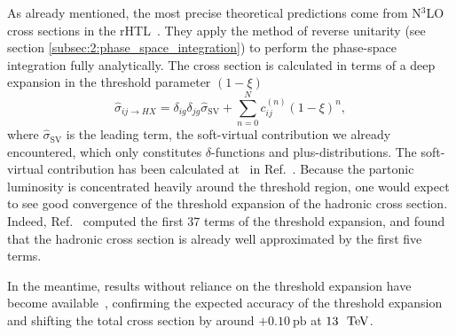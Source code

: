 As already mentioned, the most precise theoretical predictions come from N${}^3$LO cross sections in the \acs{rHTL}~\cite{Anastasiou:2015vya, Anastasiou:2016cez}. They apply the method of reverse unitarity (see section \ref{subsec:2:phase_space_integration}) to perform the phase-space integration fully analytically. The cross section is calculated in terms of a deep expansion in the threshold parameter $(1 - \xi)$
\begin{equation}
\hat{\sigma}_{ij \rightarrow HX} = \delta_{ig} \delta_{jg} \hat{\sigma}_{\mathrm{SV}} + \sum_{n = 0}^N c_{ij}^{(n)} (1 - \xi)^n,
\label{eq:4:threshold_expansion}
\end{equation}
where $\hat{\sigma}_{\mathrm{SV}}$ is the leading term, the soft-virtual contribution we already encountered, which only constitutes $\delta$-functions and plus-distributions. The soft-virtual contribution has been calculated at \NNNLO\ in Ref.~\cite{Anastasiou:2014vaa}. Because the partonic luminosity is concentrated heavily around the threshold region, one would expect to see good convergence of the threshold expansion of the hadronic cross section. Indeed, Ref.~\cite{Anastasiou:2015vya} computed the first 37 terms of the threshold expansion, and found that the hadronic cross section is already well approximated by the first five terms.

In the meantime, results without reliance on the threshold expansion have become available~\cite{Mistlberger:2018etf}, confirming the expected accuracy of the threshold expansion and shifting the total cross section by around $+0.10\ \mathrm{pb}$ at $13\ \text{ TeV}$.

